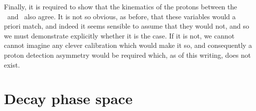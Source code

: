 Finally, it is required to show that the kinematics of the protons between the 
\pKK\ and \ppipi\ also agree.
It is not so obvious, as before, that these variables would a priori match, and 
indeed it seems sensible to assume that they would not, and so we must 
demonstrate explicitly whether it is the case.
If it is not, we cannot cannot imagine any clever calibration which would make 
it so, and consequently a proton detection asymmetry would be required which, 
as of this writing, does not exist.

\section{Decay phase space}
\label{chap:cpv:theory:phsp}


